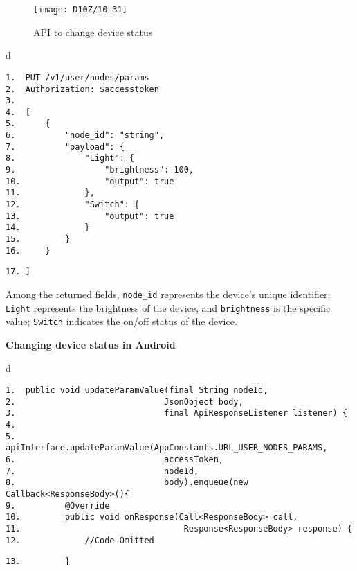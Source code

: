\documentclass[a4paper,12pt]{book}
\begin{document}
\begin{figure}[ht]
    \centering
    \texttt{[image: D10Z/10-31]}
    \caption{API to change device status}
\end{figure}

\begin{codebloc}
\begin{tabular}{d}
\vspace{2pt}
\begin{verbatim}
1.  PUT /v1/user/nodes/params
2.  Authorization: $accesstoken
3.
4.  [
5.      {
6.          "node_id": "string",
7.          "payload": {
8.              "Light": {
9.                  "brightness": 100,
10.                 "output": true
11.             },
12.             "Switch": {
13.                 "output": true
14.             }
15.         }
16.     }
\end{verbatim}
\verb|17. ]|
\end{tabular}
\end{codebloc}

Among the returned fields, \verb|node_id| represents the device’s unique identifier; \verb|Light| represents the brightness of the device, and \verb|brightness| is the specific value; \verb|Switch| indicates the on/off status of the device.

\textbf{Changing device status in Android}


\begin{codebloc}
\begin{tabular}{d}
\vspace{2pt}
\begin{verbatim}
1.  public void updateParamValue(final String nodeId,
2.                              JsonObject body, 
3.                              final ApiResponseListener listener) {
4.
5.      apiInterface.updateParamValue(AppConstants.URL_USER_NODES_PARAMS, 
6.                              accessToken, 
7.                              nodeId, 
8.                              body).enqueue(new Callback<ResponseBody>(){
9.          @Override
10.         public void onResponse(Call<ResponseBody> call,
11.                                 Response<ResponseBody> response) {
12.             //Code Omitted
\end{verbatim}
\verb|13.         }|
\end{tabular}
\end{codebloc}
\end{document}
